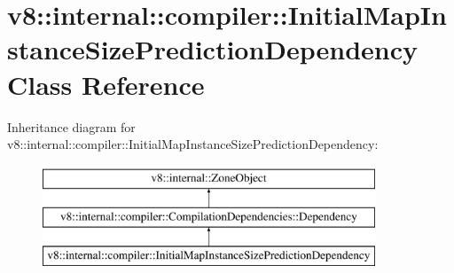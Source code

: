 \hypertarget{classv8_1_1internal_1_1compiler_1_1InitialMapInstanceSizePredictionDependency}{}\section{v8\+:\+:internal\+:\+:compiler\+:\+:Initial\+Map\+Instance\+Size\+Prediction\+Dependency Class Reference}
\label{classv8_1_1internal_1_1compiler_1_1InitialMapInstanceSizePredictionDependency}
Inheritance diagram for v8\+:\+:internal\+:\+:compiler\+:\+:Initial\+Map\+Instance\+Size\+Prediction\+Dependency\+:\begin{figure}[H]
\begin{center}
\leavevmode
\includegraphics[height=3.000000cm]{classv8_1_1internal_1_1compiler_1_1InitialMapInstanceSizePredictionDependency}
\end{center}
\end{figure}
